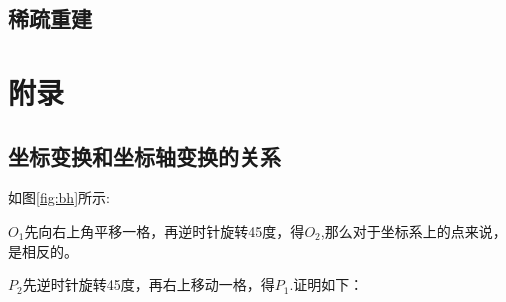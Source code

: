 \documentclass[12pt]{article}
\begin{document}
\subsection{稀疏重建}




\newpage
\section{附录}
\subsection{坐标变换和坐标轴变换的关系}
如图\ref{fig:bh}所示:

$O_1$先向右上角平移一格，再逆时针旋转45度，得$O_2$,那么对于坐标系上的点来说，是相反的。

$P_2$先逆时针旋转45度，再右上移动一格，得$P_1$.证明如下：
\end{document}
